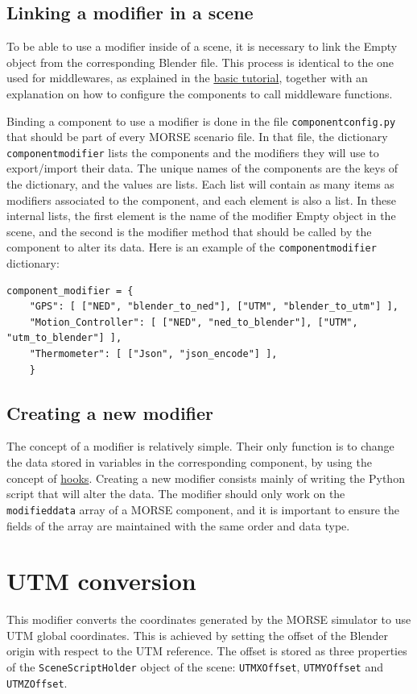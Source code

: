 \documentclass[twoside,a4paper,10pt]{report}
\newcommand{\dokutitlelevelone}[1]{\chapter{#1}}
\newcommand{\dokutitleleveltwo}[1]{\section{#1}}
\newcommand{\dokumonospace}[1]{\texttt{#1}}
\begin{document}
\dokutitleleveltwo{Linking a modifier in a scene}
\label{840a8bd36b58f7e792398436a4be45db}%

To be able to use a modifier inside of a scene, it is necessary to link the Empty object from the corresponding Blender file. This process is identical to the one used for middlewares, as explained in the \hyperref[0575c8d592fb7b088226750aceec2b4e]{ basic tutorial}, together with an explanation on how to configure the components to call middleware functions.

Binding a component to use a modifier is done in the file \dokumonospace{component{\textunderscore}config.py} that should be part of every MORSE scenario file. In that file, the dictionary \dokumonospace{component{\textunderscore}modifier} lists the components and the modifiers they will use to export/import their data. The unique names of the components are the keys of the dictionary, and the values are lists. Each list will contain as many items as modifiers associated to the component, and each element is also a list. In these internal lists, the first element is the name of the modifier Empty object in the scene, and the second is the modifier method that should be called by the component to alter its data. Here is an example of the \dokumonospace{component{\textunderscore}modifier} dictionary:


\lstset{language=python}
\begin{lstlisting}
component_modifier = {
	"GPS": [ ["NED", "blender_to_ned"], ["UTM", "blender_to_utm"] ],
	"Motion_Controller": [ ["NED", "ned_to_blender"], ["UTM", "utm_to_blender"] ],
	"Thermometer": [ ["Json", "json_encode"] ],
	}

\end{lstlisting}

\dokutitleleveltwo{Creating a new modifier}
\label{2f5deef38336990fa7f864f2028d68a9}%

The concept of a modifier is relatively simple. Their only function is to change the data stored in variables in the corresponding component, by using the concept of \hyperref[4e819c837d54a6ed09abc77a8560a66f]{hooks}. Creating a new modifier consists mainly of writing the Python script that will alter the data. The modifier should only work on the \dokumonospace{modified{\textunderscore}data} array of a MORSE component, and it is important to ensure the fields of the array are maintained with the same order and data type.


\dokutitlelevelone{UTM conversion}
\label{df94310d1616e05688abb99eb76758dc}%
\label{b32d6491ce03dd4e6c877f3bfd9ff07e}%
This modifier converts the coordinates generated by the MORSE simulator to use UTM global coordinates. This is achieved by setting the offset of the Blender origin with respect to the UTM reference. The offset is stored as three properties of the \dokumonospace{Scene{\textunderscore}Script{\textunderscore}Holder} object of the scene: \dokumonospace{UTMXOffset}, \dokumonospace{UTMYOffset} and \dokumonospace{UTMZOffset}.
\end{document}
